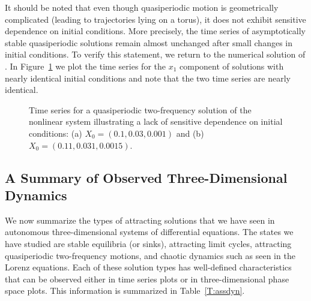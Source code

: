 It should be noted that even though quasiperiodic motion is geometrically 
complicated (leading to trajectories lying on a torus), it does not exhibit
sensitive dependence on initial conditions.  More precisely, the time series 
of asymptotically stable quasiperiodic solutions remain almost unchanged 
after small changes in initial conditions.  To verify this statement, we 
return to the numerical solution of .  In Figure~\ref{F:tor3tsab}
we plot the time series for the $x_1$ component of solutions with nearly 
identical initial conditions and note that the two time series are nearly 
identical.

\begin{figure}[htb]
   \centerline{%
   }
   \caption{Time series for a quasiperiodic two-frequency solution of the 
	nonlinear system \protect{} illustrating a lack of sensitive 
	dependence on initial conditions: (a) $X_0=(0.1,0.03,0.001)$ and (b) 
	$X_0=(0.11,0.031,0.0015)$.}
   \label{F:tor3tsab}
\end{figure}

\subsection*{A Summary of Observed Three-Dimensional Dynamics}

We now summarize the types of attracting solutions that we have seen in
autonomous three-dimensional systems of differential equations.  The states
we have studied are stable equilibria (or sinks), attracting limit cycles,
attracting quasiperiodic two-frequency motions, and chaotic dynamics such as
seen in the Lorenz equations.  Each of these solution types has well-defined
characteristics that can be observed either in time series plots or in
three-dimensional phase space plots.  This information is summarized in 
Table~\ref{T:assdyn}.

